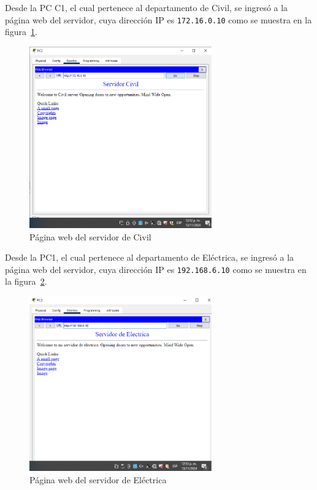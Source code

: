         Desde la PC C1, el cual pertenece al departamento de Civil, se ingresó a la página web del servidor, cuya dirección IP es \texttt{172.16.0.10} como se muestra en la figura~\ref{fig:servidorCivil}.

        \begin{figure}[H]
            \centering
            \includegraphics[width=0.7\textwidth]{img/ServerCivil.PNG}
            \caption{Página web del servidor de Civil}
            \label{fig:servidorCivil}
        \end{figure}

        Desde la PC1, el cual pertenece al departamento de Eléctrica, se ingresó a la página web del servidor, cuya dirección IP es \texttt{192.168.6.10} como se muestra en la figura~\ref{fig:servidorElectrica}.

        \begin{figure}[H]
            \centering
            \includegraphics[width=0.7\textwidth]{img/serverElectrica.PNG}
            \caption{Página web del servidor de Eléctrica}
            \label{fig:servidorElectrica}
        \end{figure}

